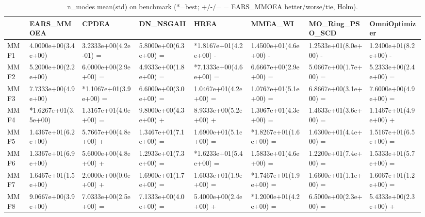 \begin{table}[t]
\centering
\caption{n_modes mean(std) on benchmark (*=best; +/-/= = EARS_MMOEA better/worse/tie, Holm).}
\label{tab:benchmark_n_modes}
\begin{tabular}{llllllll}
\toprule
 & EARS\_MMOEA & CPDEA & DN\_NSGAII & HREA & MMEA\_WI & MO\_Ring\_PSO\_SCD & OmniOptimizer \\
\midrule
MMF1 & 4.0000e+00(3.4e+00) & 3.2333e+00(4.2e-01) = & 5.8000e+00(6.3e+00) = & *1.8167e+01(4.2e+00) - & 1.4500e+01(4.6e+00) - & 1.2533e+01(8.0e+00) - & 1.2400e+01(8.2e+00) - \\
MMF2 & 5.2000e+00(2.2e+00) & 6.0000e+00(2.9e+00) = & 4.9333e+00(1.8e+00) = & *7.1333e+00(4.6e+00) = & 6.6667e+00(2.9e+00) = & 5.0667e+00(1.7e+00) = & 5.2333e+00(2.4e+00) = \\
MMF3 & 7.7333e+00(4.9e+00) & *1.1067e+01(3.9e+00) = & 6.6000e+00(3.0e+00) = & 1.0467e+01(4.2e+00) = & 1.0767e+01(5.1e+00) = & 6.8667e+00(3.1e+00) = & 7.6000e+00(4.9e+00) = \\
MMF4 & *1.6267e+01(3.5e+00) & 1.3167e+01(4.0e+00) = & 9.8000e+00(4.3e+00) + & 8.9333e+00(5.2e+00) + & 1.3067e+01(4.3e+00) = & 1.4633e+01(3.6e+00) = & 1.1467e+01(4.9e+00) + \\
MMF5 & 1.4367e+01(6.2e+00) & 5.7667e+00(4.8e+00) + & 1.3467e+01(7.1e+00) = & 1.6900e+01(5.1e+00) = & *1.8267e+01(1.6e+00) = & 1.6300e+01(4.4e+00) = & 1.5167e+01(6.5e+00) = \\
MMF6 & 1.3367e+01(6.9e+00) & 5.6000e+00(4.8e+00) + & 1.2933e+01(7.3e+00) = & *1.6233e+01(5.4e+00) = & 1.5833e+01(4.6e+00) = & 1.2200e+01(7.4e+00) = & 1.5333e+01(5.7e+00) = \\
MMF7 & 1.6467e+01(1.5e+00) & 2.0000e+00(0.0e+00) + & 1.6900e+01(1.7e+00) = & 1.6033e+01(1.9e+00) = & *1.7467e+01(1.9e+00) = & 1.6600e+01(1.1e+00) = & 1.6067e+01(1.2e+00) = \\
MMF8 & 9.0667e+00(3.9e+00) & 7.0333e+00(2.5e+00) = & 7.1333e+00(4.0e+00) = & 5.4000e+00(2.4e+00) + & *1.2000e+01(4.2e+00) = & 6.5000e+00(2.3e+00) = & 5.4333e+00(2.3e+00) + \\
\bottomrule
\end{tabular}
\end{table}
